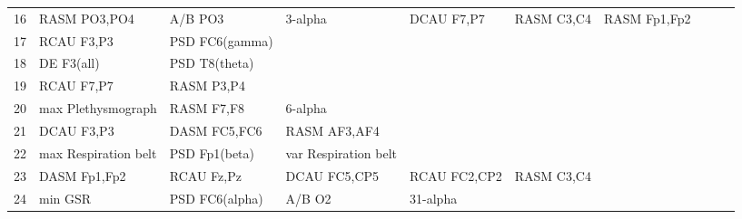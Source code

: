 \begin{landscape}
\begin{table}[]
\begin{tabular}{l|llllllll}
16       & RASM PO3,PO4          & A/B PO3               & 3-alpha              & DCAU F7,P7              & RASM C3,C4              & RASM Fp1,Fp2         &                      &                       &                       &                    \\
17       & RCAU F3,P3            & PSD FC6(gamma)        &                      &                         &                         &                      &                      &                       &                       &                    \\
18       & DE F3(all)            & PSD T8(theta)         &                      &                         &                         &                      &                      &                       &                       &                    \\
19       & RCAU F7,P7            & RASM P3,P4            &                      &                         &                         &                      &                      &                       &                       &                    \\
20       & max Plethysmograph    & RASM F7,F8            & 6-alpha              &                         &                         &                      &                      &                       &                       &                    \\
21       & DCAU F3,P3            & DASM FC5,FC6          & RASM AF3,AF4         &                         &                         &                      &                      &                       &                       &                    \\
22       & max Respiration belt  & PSD Fp1(beta)         & var Respiration belt &                         &                         &                      &                      &                       &                       &                    \\
23       & DASM Fp1,Fp2          & RCAU Fz,Pz            & DCAU FC5,CP5         & RCAU FC2,CP2            & RASM C3,C4              &                      &                      &                       &                       &                    \\
24       & min GSR               & PSD FC6(alpha)        & A/B O2               & 31-alpha                &                         &                      &                      &                       &                       &                    \\

\end{tabular}
\end{table}
\end{landscape}
